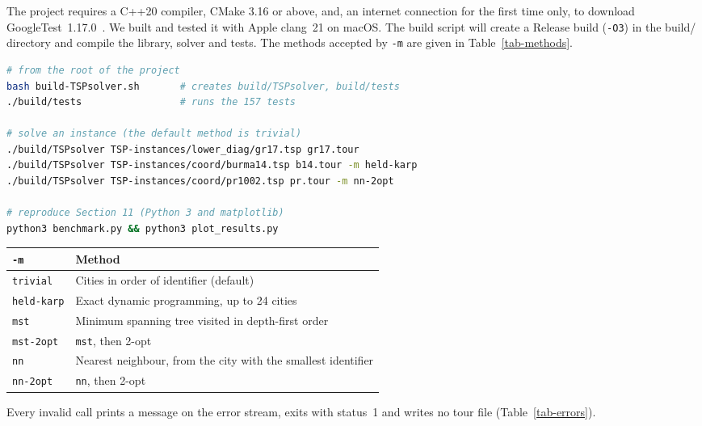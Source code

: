 \documentclass[10pt,a4paper]{article}
\begin{document}
The project requires a C++20 compiler, CMake 3.16 or above, and, an internet connection for the first time only, to download GoogleTest~1.17.0~\cite{gtest}. We built and tested it with Apple clang~21 on macOS. The build script will create a Release build (\texttt{-O3}) in the build/ directory and compile the library, solver and tests. The methods accepted by \texttt{-m} are given in Table~\ref{tab-methods}.

\noindent
\begin{minipage}[t]{0.585\linewidth}
\vspace{0pt}
\begin{lstlisting}[language=bash, style=side]
# from the root of the project
bash build-TSPsolver.sh       # creates build/TSPsolver, build/tests
./build/tests                 # runs the 157 tests

# solve an instance (the default method is trivial)
./build/TSPsolver TSP-instances/lower_diag/gr17.tsp gr17.tour
./build/TSPsolver TSP-instances/coord/burma14.tsp b14.tour -m held-karp
./build/TSPsolver TSP-instances/coord/pr1002.tsp pr.tour -m nn-2opt

# reproduce Section 11 (Python 3 and matplotlib)
python3 benchmark.py && python3 plot_results.py
\end{lstlisting}
\end{minipage}\hfill
\begin{minipage}[t]{0.39\linewidth}
\vspace{0pt}
\centering\scriptsize
\begin{tabularx}{\linewidth}{@{}l Y@{}}
\toprule
\texttt{-m} & Method \\
\midrule
\texttt{trivial} & Cities in order of identifier (default) \\
\texttt{held-karp} & Exact dynamic programming, up to 24 cities \\
\texttt{mst} & Minimum spanning tree visited in depth-first order \\
\texttt{mst-2opt} & \texttt{mst}, then 2-opt \\
\texttt{nn} & Nearest neighbour, from the city with the smallest identifier \\
\texttt{nn-2opt} & \texttt{nn}, then 2-opt \\
\bottomrule
\end{tabularx}
\label{tab-methods}
\end{minipage}

\medskip
Every invalid call prints a message on the error stream, exits with status~1 and writes no tour file (Table~\ref{tab-errors}).
\end{document}
